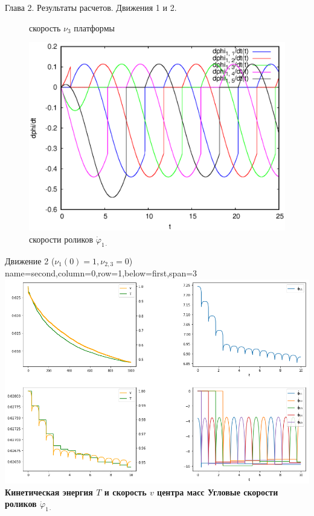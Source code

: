 \begin{myposter}{
    Глава 2. Результаты расчетов. Движения 1 и 2.
}
{{\begin{figure}[H]
                    \vspace{-15pt}
                    \caption{{\huge{} скорость $\nu_3$ платформы}}
                \endminipage
                \enspace
                    \centering
                    \includegraphics[width=\linewidth]{content/pic/self_rot_25/rol_vel.eps}
                    \vspace{-15pt}
                    \caption{{\huge{} скорости роликов $\dot{\varphi}_{1\cdot}$}}
                \endminipage
            \end{figure}
            \vspace{10pt}
        }
    }
    
    \headerbox
    {Движение 2 ($\nu_1(0) = 1, \nu_{2,3} = 0$)}
    {name=second,column=0,row=1,below=first,span=3}
    {
        {\huge\bf
            \vspace{10pt}
            \centering
            \includegraphics[width=\linewidth]{content/pic/new/impact_2_sub.png}
                \huge{Кинетическая энергия $T$ и скорость $v$ центра масс}
            \endminipage
            \qquad
                \huge{Угловые скорости роликов $\dot{\varphi}_{1\cdot}$}
            \endminipage
            \vspace{10pt}
        }
    }
    
\end{myposter}
